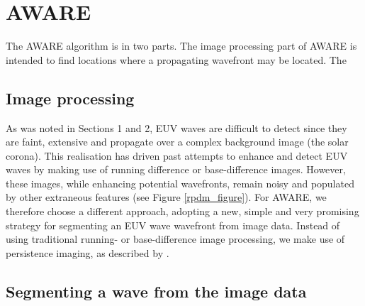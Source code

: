 \section{AWARE}\label{sec:aware}

The AWARE algorithm is in two parts.  The image processing part of
AWARE is intended to find locations where a propagating wavefront may
be located.  The 


\subsection{Image processing}
\label{img_proc}

As was noted in Sections 1 and 2, EUV waves are difficult to detect
since they are faint, extensive and propagate over a complex
background image (the solar corona). This realisation has driven past
attempts to enhance and detect EUV waves by making use of running
difference or base-difference images. However, these images, while
enhancing potential wavefronts, remain noisy and populated by other
extraneous features (see Figure \ref{rpdm_figure}). For AWARE, we
therefore choose a different approach, adopting a new, simple and very
promising strategy for segmenting an EUV wave wavefront from image
data. Instead of using traditional running- or base-difference image
processing, we make use of persistence imaging, as described by
\citet{2014AAS...22421838T}.

\subsection{Segmenting a wave from the image data}\label{sec:aware:segment}

